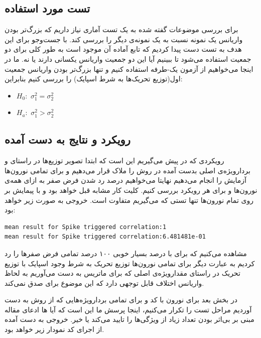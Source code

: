 \documentclass[12pt,onecolumn,a4paper,fleqn]{article}
\begin{document}
\subsection{تست مورد استفاده}
برای بررسی موضوعات گفته شده به یک تست آماری نیاز داریم که بزرگ‌تر بودن واریانس یک نمونه‌ نسبت به یک نمونه‌ی دیگر را بررسی کند. با جست‌وجو برای این هدف به تست  دست پیدا کردیم که تابع آماده آن موجود است به طور کلی  برای دو جمعیت استفاده می‌شود تا ببینیم آیا این دو جمعیت واریانس یکسانی دارند یا نه. ما در اینجا می‌خواهیم از آزمون یک-طرفه استفاده کنیم و تنها بزرگ‌تر بودن واریانس جمعیت اول(توزیع‌ تحریک‌ها به شرط اسپایک) را بررسی کنیم بنابراین:

\begin{latin}
\begin{itemize}
	\item 
	$H_0:$ \space $\sigma_1^2 = \sigma_2^2$
	\item 
	$H_a:$ \space
	$\sigma_1^2 > \sigma_2^2$
\end{itemize}
\end{latin}

\subsection{رویکرد و نتایج به دست آمده}
رویکردی که در پیش می‌گیریم این است که ابتدا تصویر توزیع‌ها در راستای‌ 
و بردارویژه‌ی اصلی بدست آمده در روش  را ملاک قرار می‌دهیم و برای تمامی نورون‌ها آزمایش  را انجام می‌دهیم نهایتا می‌خواهیم درصد رد شدن فرض صفر به ازای همه‌ی نورون‌ها و برای هر رویکرد بررسی کنیم. کلیت کار مشابه قبل خواهد بود و با پیمایش بر روی تمام نورون‌ها  تنها تستی که می‌گیریم متفاوت است. خروجی به صورت زیر خواهد بود:

\begin{latin}
	\begin{lstlisting}[basicstyle=\small, frame = single]
mean result for Spike triggered correlation:1
mean result for Spike triggered correlation:6.481481e-01
	\end{lstlisting}
\end{latin}

مشاهده می‌کنیم که برای  با درصد بسیار خوبی ۱۰۰ درصد تمامی فرض صفر‌ها را رد کردیم به عبارت دیگر برای تمامی نورون‌ها توزیع تحریک به شرط وجود اسپایک با توزیع تحریک در راستای‌ مقدارویژه‌ی اصلی که برای ماتریس  به دست می‌آوریم به لحاظ واریانس اختلاف قابل توجهی دارد که این موضوع برای  صدق نمی‌کند.

در بخش بعد برای نورون با کد
 و برای تمامی بردارویژه‌هایی که از روش  به دست آوردیم مراحل تست را تکرار می‌کنیم، اینجا پرسش ما این است که آیا ها ادعای مقاله مبنی بر بی‌اثر بودن تعداد زیاد از ویژگی‌ها را تایید می‌کند یا خیر. خروجی به دست آمده از اجرای کد نمودار زیر خواهد بود.
 
\end{document}
